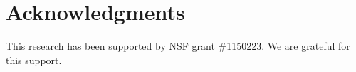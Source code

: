\documentclass{TeXstyles/DARS/svmult}  %
\begin{document}
\section*{Acknowledgments}
This research has been supported by NSF grant \#1150223. We are grateful for this support.


\end{document}
